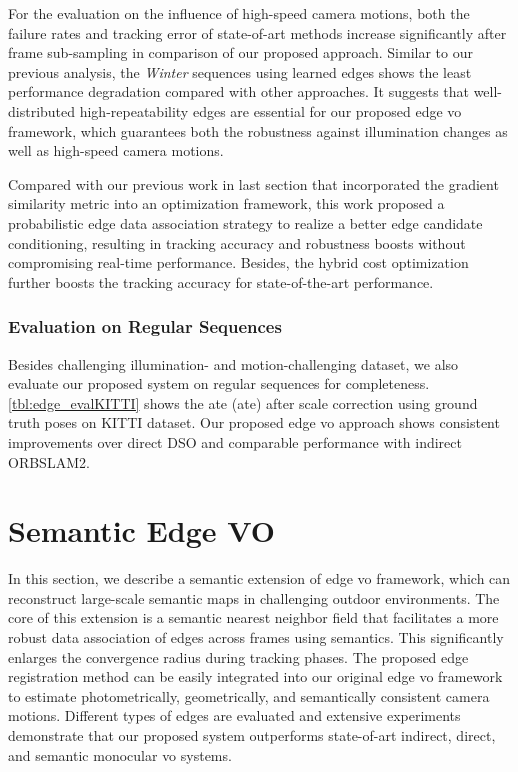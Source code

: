 For the evaluation on the influence of high-speed camera motions, both the failure rates and tracking error of state-of-art methods increase significantly after frame sub-sampling in comparison of our proposed approach. Similar to our previous analysis, the {\em Winter} sequences using learned edges shows the least performance degradation compared with other approaches. It suggests that well-distributed high-repeatability edges are essential for our proposed edge \acrshort{vo} framework, which guarantees both the robustness against illumination changes as well as high-speed camera motions.  

Compared with our previous work in last section that incorporated the gradient similarity metric into an optimization framework, this work proposed a probabilistic edge data association strategy to realize a better edge candidate conditioning, resulting in tracking accuracy and robustness boosts without compromising real-time performance. Besides, the hybrid cost optimization further boosts the tracking accuracy for state-of-the-art performance.

\subsubsection{Evaluation on Regular Sequences }
Besides challenging illumination- and motion-challenging dataset, we also evaluate our proposed system on regular sequences for completeness. \ref{tbl:edge_evalKITTI} shows the \acrlong{ate} (\acrshort{ate}) after scale correction using ground truth poses on KITTI \cite{geiger2012we} dataset. Our proposed edge \acrshort{vo} approach shows consistent improvements over direct DSO and comparable performance with indirect ORBSLAM2.  


\section{Semantic Edge VO}
In this section, we describe a semantic extension of edge \acrshort{vo} framework, which can reconstruct large-scale semantic maps in challenging outdoor environments. 
The core of this extension is a semantic nearest neighbor field that facilitates a more robust data association of edges across frames using semantics. 
This significantly enlarges the convergence radius during tracking phases. The proposed edge registration method can be easily integrated into our original edge \acrshort{vo} framework to estimate photometrically, geometrically, and semantically consistent camera motions. 
Different types of edges are evaluated and extensive experiments demonstrate that our proposed system outperforms state-of-art indirect, direct, and semantic monocular \acrshort{vo} systems. 

